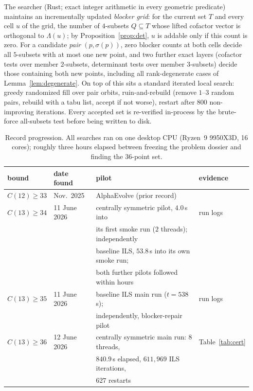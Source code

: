 \documentclass[10pt]{article}
\theoremstyle{remark}
\begin{document}
The searcher (Rust; exact integer arithmetic in every geometric predicate)
maintains an
incrementally updated \emph{blocker grid}: for the current set $T$ and every
cell $u$ of the grid, the number of $4$-subsets $Q \subseteq T$ whose lifted
cofactor vector is orthogonal to $\Lambda(u)$; by
Proposition~\ref{prop:det}, $u$ is addable only if this count is zero. For a
candidate \emph{pair} $(p, \sigma(p))$, zero blocker counts at both cells
decide all $5$-subsets with at most one new point, and two further exact
layers (cofactor tests over member $2$-subsets, determinant tests over
member $3$-subsets) decide those containing both new points, including all
rank-degenerate cases of Lemma~\ref{lem:degenerate}. On top of this sits a
standard iterated local search: greedy randomized fill over pair orbits,
ruin-and-rebuild (remove $1$--$3$ random pairs, rebuild with a tabu list,
accept if not worse), restart after $800$ non-improving iterations. Every
accepted set is re-verified in-process by the brute-force all-subsets test
before being written to disk.

\begin{table}[ht]
\centering\footnotesize
\begin{tabular}{@{}llll@{}}
\toprule
bound & date found & pilot & evidence \\
\midrule
$C(12) \ge 33$ & Nov.\ 2025 & AlphaEvolve (prior record) & \cite{AlphaEvolveMath,Repo} \\
$C(13) \ge 34$ & 11 June 2026 & centrally symmetric pilot, $4.0$\,s into & run logs \\
 & & its first smoke run ($2$ threads); independently & \\
 & & baseline ILS, $53.8$\,s into its own smoke run; & \\
 & & both further pilots followed within hours & \\
$C(13) \ge 35$ & 11 June 2026 & baseline ILS main run ($t = 538$\,s); & run logs \\
 & & independently, blocker-repair pilot & \\
$C(13) \ge 36$ & 12 June 2026 & centrally symmetric main run: $8$ threads, & Table~\ref{tab:cert} \\
 & & $840.9$\,s elapsed, $611{,}969$ ILS iterations, & \\
 & & $627$ restarts & \\
\bottomrule
\end{tabular}
\caption{Record progression. All searches ran on one desktop CPU (Ryzen~9
9950X3D, 16 cores); roughly three hours elapsed between freezing the
problem dossier and finding the $36$-point set.}
\label{tab:timeline}
\end{table}
\end{document}

